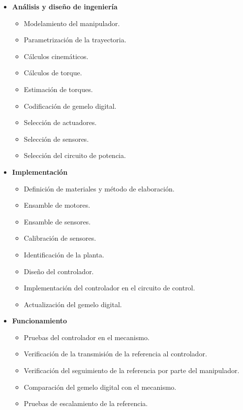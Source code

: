 \documentclass[11pt,a4paper]{article}
\begin{document}
\begin{itemize}
    \item \textbf{Análisis y diseño de ingeniería}
    \begin{itemize}
        \item Modelamiento del manipulador.
        \item Parametrización de la trayectoria.
        \item Cálculos cinemáticos.
        \item Cálculos de torque.
        \item Estimación de torques.
        \item Codificación de gemelo digital. 
        \item Selección de actuadores.
        \item Selección de sensores.
        \item Selección del circuito de potencia.
    \end{itemize}

    \item \textbf{Implementación}
    \begin{itemize}
        \item Definición de materiales y método de elaboración.
        \item Ensamble de motores.
        \item Ensamble de sensores.
        \item Calibración de sensores.
        \item Identificación de la planta.
        \item Diseño del controlador.
        \item Implementación del controlador en el circuito de control.
        \item Actualización del gemelo digital.
    \end{itemize}

    \item \textbf{Funcionamiento}
    \begin{itemize}
        \item Pruebas del controlador en el mecanismo.
        \item Verificación de la transmisión de la referencia al controlador.
        \item Verificación del seguimiento de la referencia por parte del manipulador.
        \item Comparación del gemelo digital con el mecanismo.
        \item Pruebas de escalamiento de la referencia.
    \end{itemize}
\end{itemize}
\end{document}
